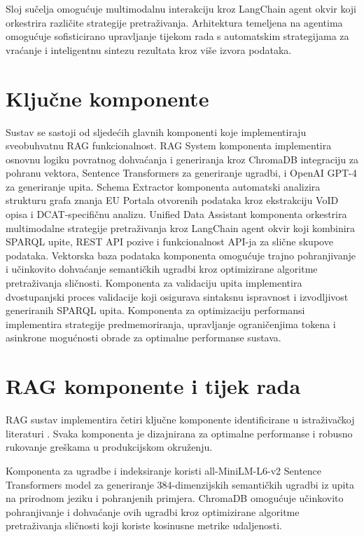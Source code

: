 Sloj sučelja omogućuje multimodalnu interakciju kroz LangChain agent okvir koji orkestrira različite strategije pretraživanja. Arhitektura temeljena na agentima omogućuje sofisticirano upravljanje tijekom rada s automatskim strategijama za vraćanje i inteligentnu sintezu rezultata kroz više izvora podataka.

\section{Ključne komponente}
\label{sec:key_components}

Sustav se sastoji od sljedećih glavnih komponenti koje implementiraju sveobuhvatnu RAG funkcionalnost. RAG System komponenta implementira osnovnu logiku povratnog dohvaćanja i generiranja kroz ChromaDB integraciju za pohranu vektora, Sentence Transformers za generiranje ugradbi, i OpenAI GPT-4 za generiranje upita. Schema Extractor komponenta automatski analizira strukturu grafa znanja EU Portala otvorenih podataka kroz ekstrakciju VoID opisa i DCAT-specifičnu analizu. Unified Data Assistant komponenta orkestrira multimodalne strategije pretraživanja kroz LangChain agent okvir koji kombinira SPARQL upite, REST API pozive i funkcionalnost API-ja za slične skupove podataka. Vektorska baza podataka komponenta omogućuje trajno pohranjivanje i učinkovito dohvaćanje semantičkih ugradbi kroz optimizirane algoritme pretraživanja sličnosti. Komponenta za validaciju upita implementira dvostupanjski proces validacije koji osigurava sintaksnu ispravnost i izvodljivost generiranih SPARQL upita. Komponenta za optimizaciju performansi implementira strategije predmemoriranja, upravljanje ograničenjima tokena i asinkrone mogućnosti obrade za optimalne performanse sustava.

\section{RAG komponente i tijek rada}
\label{sec:rag_components}

RAG sustav implementira četiri ključne komponente identificirane u istraživačkoj literaturi \cite{lewis2020retrieval, reimers2019sentence, wang2023vector}. Svaka komponenta je dizajnirana za optimalne performanse i robusno rukovanje greškama u produkcijskom okruženju.

Komponenta za ugradbe i indeksiranje koristi all-MiniLM-L6-v2 Sentence Transformers model za generiranje 384-dimenzijskih semantičkih ugradbi iz upita na prirodnom jeziku i pohranjenih primjera. ChromaDB omogućuje učinkovito pohranjivanje i dohvaćanje ovih ugradbi kroz optimizirane algoritme pretraživanja sličnosti koji koriste kosinusne metrike udaljenosti.


